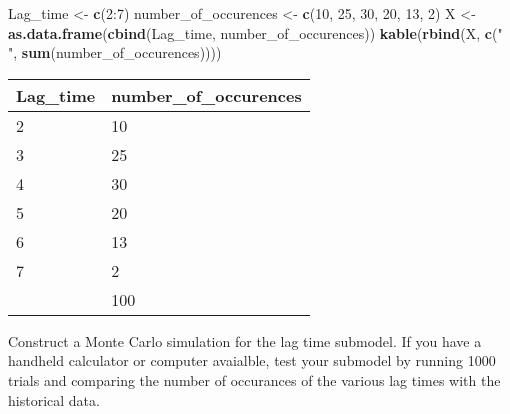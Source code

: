 \documentclass[]{article}
\newenvironment{Shaded}{\begin{snugshade}}{\end{snugshade}}
\newcommand{\KeywordTok}[1]{\textcolor[rgb]{0.13,0.29,0.53}{\textbf{{#1}}}}
\newcommand{\DecValTok}[1]{\textcolor[rgb]{0.00,0.00,0.81}{{#1}}}
\newcommand{\StringTok}[1]{\textcolor[rgb]{0.31,0.60,0.02}{{#1}}}
\newcommand{\NormalTok}[1]{{#1}}
\begin{document}
\begin{Shaded}
\begin{Highlighting}[]
\NormalTok{Lag_time <-}\StringTok{ }\KeywordTok{c}\NormalTok{(}\DecValTok{2}\NormalTok{:}\DecValTok{7}\NormalTok{)}
\NormalTok{number_of_occurences <-}\StringTok{ }\KeywordTok{c}\NormalTok{(}\DecValTok{10}\NormalTok{, }\DecValTok{25}\NormalTok{, }\DecValTok{30}\NormalTok{, }\DecValTok{20}\NormalTok{, }\DecValTok{13}\NormalTok{, }\DecValTok{2}\NormalTok{)}
\NormalTok{X <-}\StringTok{ }\KeywordTok{as.data.frame}\NormalTok{(}\KeywordTok{cbind}\NormalTok{(Lag_time, number_of_occurences))}
\KeywordTok{kable}\NormalTok{(}\KeywordTok{rbind}\NormalTok{(X, }\KeywordTok{c}\NormalTok{(}\StringTok{" "}\NormalTok{, }\KeywordTok{sum}\NormalTok{(number_of_occurences))))}
\end{Highlighting}
\end{Shaded}

\begin{longtable}[]{@{}ll@{}}
\toprule
Lag\_time & number\_of\_occurences\tabularnewline
\midrule
\endhead
2 & 10\tabularnewline
3 & 25\tabularnewline
4 & 30\tabularnewline
5 & 20\tabularnewline
6 & 13\tabularnewline
7 & 2\tabularnewline
& 100\tabularnewline
\bottomrule
\end{longtable}

Construct a Monte Carlo simulation for the lag time submodel. If you
have a handheld calculator or computer avaialble, test your submodel by
running 1000 trials and comparing the number of occurances of the
various lag times with the historical data.
\end{document}
